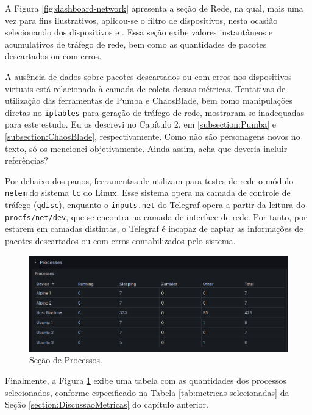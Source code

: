A Figura \ref{fig:dashboard-network} apresenta a seção de Rede, na qual, mais uma vez para fins ilustrativos, aplicou-se o filtro de dispositivos, nesta ocasião selecionando dos dispositivos  e . Essa seção exibe valores instantâneos e acumulativos de tráfego de rede, bem como as quantidades de pacotes descartados ou com erros.

{\color{red}
A ausência de dados sobre pacotes descartados ou com erros nos dispositivos virtuais está relacionada à camada de coleta dessas métricas. Tentativas de utilização das ferramentas de  Pumba e ChaosBlade, bem como manipulações diretas no \verb|iptables| para geração de tráfego de rede, mostraram-se inadequadas para este estudo.} {\color{blue}Eu os descrevi no Capítulo 2, em \ref{subsection:Pumba} e \ref{subsection:ChaosBlade}, respectivamente. Como não são personagens novos no texto, só os mencionei objetivamente. Ainda assim, acha que deveria incluir referências?}

Por debaixo dos panos, ferramentas de  utilizam para testes de rede o módulo \verb|netem| do sistema \verb|tc| do Linux. Esse sistema opera na camada de controle de tráfego (\verb|qdisc|), enquanto o  \verb|inputs.net| do Telegraf opera a partir da leitura do \verb|procfs/net/dev|, que se encontra na camada de interface de rede. Por tanto, por estarem em camadas distintas, o Telegraf é incapaz de captar as informações de pacotes descartados ou com erros contabilizados pelo sistema.

\begin{figure}[H]
\centering
\setlength{\abovecaptionskip}{-20pt}
\includegraphics[width=\textwidth]{Imagens/chap04/dashboard/processes.png}
\caption{Seção de Processos.}
\label{fig:dashboard-processes}
\end{figure}

Finalmente, a Figura \ref{fig:dashboard-processes} exibe uma tabela com as quantidades dos processos selecionados, conforme especificado na Tabela \ref{tab:metricas-selecionadas} da Seção \ref{section:DiscussaoMetricas} do capítulo anterior.

